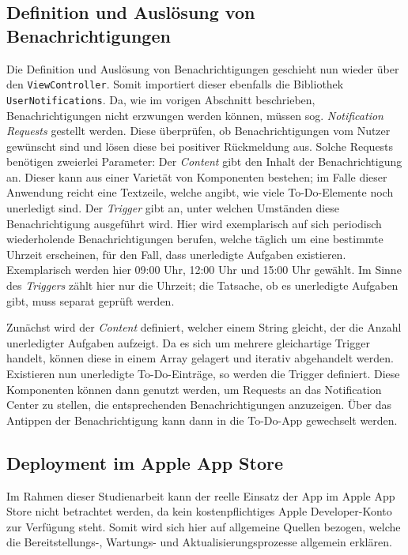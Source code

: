 \subsection{Definition und Auslösung von Benachrichtigungen}
Die Definition und Auslösung von Benachrichtigungen geschieht nun wieder über den \texttt{ViewController}. Somit importiert dieser ebenfalls die Bibliothek \texttt{UserNotifications}. Da, wie im vorigen Abschnitt beschrieben, Benachrichtigungen nicht erzwungen werden können, müssen sog. \textit{Notification Requests} gestellt werden. Diese überprüfen, ob Benachrichtigungen vom Nutzer gewünscht sind und lösen diese bei positiver Rückmeldung aus. Solche Requests benötigen zweierlei Parameter: Der \textit{Content} gibt den Inhalt der Benachrichtigung an. Dieser kann aus einer Varietät von Komponenten bestehen; im Falle dieser Anwendung reicht eine Textzeile, welche angibt, wie viele To-Do-Elemente noch unerledigt sind. Der \textit{Trigger} gibt an, unter welchen Umständen diese Benachrichtigung ausgeführt wird. Hier wird exemplarisch auf sich periodisch wiederholende Benachrichtigungen berufen, welche täglich um eine bestimmte Uhrzeit erscheinen, für den Fall, dass unerledigte Aufgaben existieren. Exemplarisch werden hier 09:00 Uhr, 12:00 Uhr und 15:00 Uhr gewählt. Im Sinne des \textit{Triggers} zählt hier nur die Uhrzeit; die Tatsache, ob es unerledigte Aufgaben gibt, muss separat geprüft werden.

Zunächst wird der \textit{Content} definiert, welcher einem String gleicht, der die Anzahl unerledigter Aufgaben aufzeigt. Da es sich um mehrere gleichartige Trigger handelt, können diese in einem Array gelagert und iterativ abgehandelt werden. Existieren nun unerledigte To-Do-Einträge, so werden die Trigger definiert. Diese Komponenten können dann genutzt werden, um Requests an das Notification Center zu stellen, die entsprechenden Benachrichtigungen anzuzeigen. Über das Antippen der Benachrichtigung kann dann in die To-Do-App gewechselt werden.

\subsection{Deployment im Apple App Store}
Im Rahmen dieser Studienarbeit kann der reelle Einsatz der App im Apple App Store nicht betrachtet werden, da kein kostenpflichtiges Apple Developer-Konto zur Verfügung steht. Somit wird sich hier auf allgemeine Quellen bezogen, welche die Bereitstellungs-, Wartungs- und Aktualisierungsprozesse allgemein erklären.

